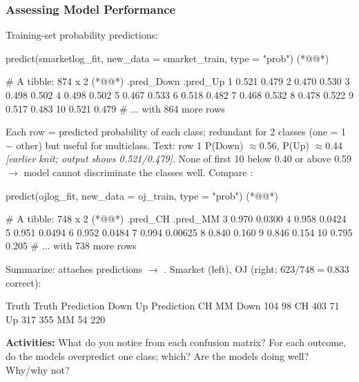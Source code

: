 \subsubsection{Assessing Model Performance}
%
Training-set probability predictions:
\begin{rcode}
predict(smarketlog_fit, new_data = smarket_train, type = "prob")  (*@@*)
\end{rcode}
\begin{routput}
# A tibble: 874 x 2                (*@@*)
   .pred_Down .pred_Up
 1      0.521    0.479
 2      0.470    0.530
 3      0.498    0.502
 4      0.498    0.502
 5      0.467    0.533
 6      0.518    0.482
 7      0.468    0.532
 8      0.478    0.522
 9      0.517    0.483
10      0.521    0.479
# ... with 864 more rows
\end{routput}
Each row = predicted probability of each class; redundant for 2 classes (one = 1 $-$ other) but useful for multiclass. Text: row 1 P(Down) $\approx$0.56, P(Up) $\approx$0.44 {\color{figgray}\itshape [earlier knit; output shows 0.521/0.479]}. None of first 10 below 0.40 or above 0.59 $\to$ model cannot discriminate the classes well. Compare :
\begin{rcode}
predict(ojlog_fit, new_data = oj_train, type = "prob")   (*@@*)
\end{rcode}
\begin{routput}
# A tibble: 748 x 2               (*@@*)
   .pred_CH .pred_MM
 3    0.970  0.0300
 4    0.958  0.0424
 5    0.951  0.0494
 6    0.952  0.0484
 7    0.994  0.00625
 8    0.840  0.160
 9    0.846  0.154
10    0.795  0.205
# ... with 738 more rows
\end{routput}
Summarize:  attaches predictions $\to$ . Smarket (left), OJ (right; $623/748=0.833$ correct):
\begin{routput}
          Truth                      Truth
Prediction Down  Up        Prediction  CH  MM
      Down  104  98                CH 403  71
      Up    317 355                MM  54 220
\end{routput}
\textbf{Activities:} What do you notice from each confusion matrix? For each outcome, do the models overpredict one class; which? Are the models doing well? Why/why not?

